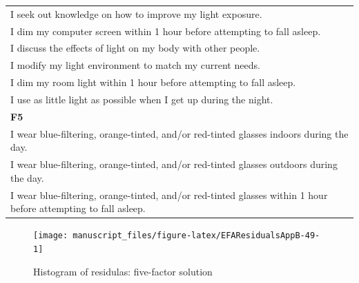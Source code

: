 \documentclass[
  english,
  man]{apa6}
\begin{document}
\begin{appendix}
\begin{longtable}[]{@{}
  >{\raggedright\arraybackslash}p{}@{}}
I seek out knowledge on how to improve my light exposure. \\
I dim my computer screen within 1 hour before attempting to fall
asleep. \\
I discuss the effects of light on my body with other people. \\
I modify my light environment to match my current needs. \\
I dim my room light within 1 hour before attempting to fall asleep. \\
I use as little light as possible when I get up during the night. \\
\textbf{F5} \\
I wear blue-filtering, orange-tinted, and/or red-tinted glasses indoors
during the day. \\
I wear blue-filtering, orange-tinted, and/or red-tinted glasses outdoors
during the day. \\
I wear blue-filtering, orange-tinted, and/or red-tinted glasses within 1
hour before attempting to fall asleep. \\
\bottomrule
\end{longtable}

\begin{figure}

{\centering \texttt{[image: manuscript\_files/figure-latex/EFAResidualsAppB-49-1]} 

}

\caption{ Histogram of residulas:  five-factor solution}\label{fig:EFAResidualsAppB-49}
\end{figure}
\end{appendix}

\clearpage
\makeatletter
\efloat@restorefloats
\makeatother
\end{document}
